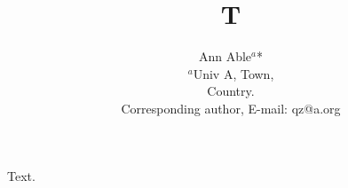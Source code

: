 \documentclass{article}
\title{T}
\author{Ann Able$^{a}$*\\
{\small $^{a}$Univ A, Town,}\\
{\small Country.}\\
{\small * Corresponding author, E-mail: qz@a.org }\\
}
\date{}
\begin{document}
\maketitle
Text.
\end{document}
